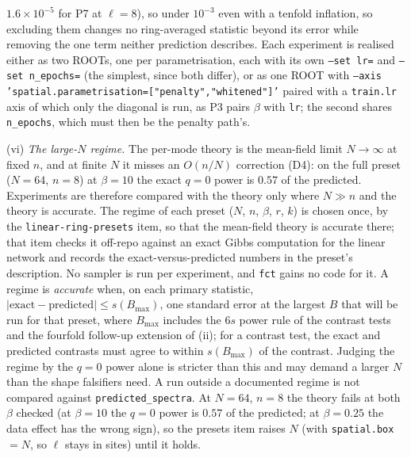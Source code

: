 \documentclass[11pt,a4paper]{article}
\newcommand{\code}[1]{\texttt{#1}}
\begin{document}
$1.6\times10^{-5}$ for P7 at $\ell = 8$), so under $10^{-3}$ even with a tenfold inflation, so excluding them changes no ring-averaged statistic beyond its error while removing the one term neither prediction describes. Each experiment is realised either as two ROOTs, one per parametrisation, each with its own \code{--set lr=} and \code{--set n\_epochs=} (the simplest, since both differ), or as one ROOT with \code{--axis 'spatial.parametrisation=["penalty","whitened"]'} paired with a \code{train.lr} axis of which only the diagonal is run, as P3 pairs $\beta$ with \code{lr}; the second shares \code{n\_epochs}, which must then be the penalty path's.

(vi) \emph{The large-$N$ regime.} The per-mode theory is the mean-field limit $N\to\infty$ at fixed $n$, and at finite $N$ it misses an $O(n/N)$ correction (D4): on the full preset ($N = 64$, $n = 8$) at $\beta = 10$ the exact $q = 0$ power is $0.57$ of the predicted. Experiments are therefore compared with the theory only where $N\gg n$ and the theory is accurate. The regime of each preset ($N$, $n$, $\beta$, $r$, $k$) is chosen once, by the \code{linear-ring-presets} item, so that the mean-field theory is accurate there; that item checks it off-repo against an exact Gibbs computation for the linear network and records the exact-versus-predicted numbers in the preset's description. No sampler is run per experiment, and \code{fct} gains no code for it. A regime is \emph{accurate} when, on each primary statistic, $|\text{exact} - \text{predicted}|\le s(B_{\max})$, one standard error at the largest $B$ that will be run for that preset, where $B_{\max}$ includes the $6s$ power rule of the contrast tests and the fourfold follow-up extension of (ii); for a contrast test, the exact and predicted contrasts must agree to within $s(B_{\max})$ of the contrast. Judging the regime by the $q = 0$ power alone is stricter than this and may demand a larger $N$ than the shape falsifiers need. A run outside a documented regime is not compared against \code{predicted\_spectra}. At $N = 64$, $n = 8$ the theory fails at both $\beta$ checked (at $\beta = 10$ the $q = 0$ power is $0.57$ of the predicted; at $\beta = 0.25$ the data effect has the wrong sign), so the presets item raises $N$ (with \code{spatial.box} $= N$, so $\ell$ stays in sites) until it holds.
\end{document}
